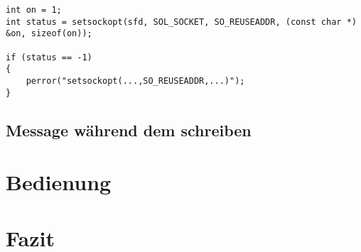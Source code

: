 \documentclass[a4paper]{article}
\begin{document}
\begin{verbatim}
int on = 1;
int status = setsockopt(sfd, SOL_SOCKET, SO_REUSEADDR, (const char *) &on, sizeof(on));

if (status == -1) 
{   
    perror("setsockopt(...,SO_REUSEADDR,...)");
}
\end{verbatim}

\subsection{Message während dem schreiben}
\section{Bedienung}
\section{Fazit}
\end{document}
